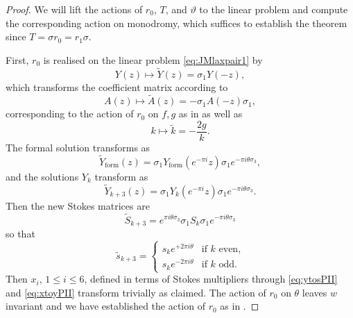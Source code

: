 \documentclass[a4paper,reqno]{amsart}
\numberwithin{equation}{section}
\numberwithin{equation}{section}
\begin{document}
\begin{proof}
    We will lift the actions of $r_0$, $T$, and $\vartheta$ to the linear problem and compute the corresponding action on monodromy, which suffices to establish the theorem since $T=\sigma r_0 = r_1\sigma$.
    
    First, $r_0$ is realised on the linear problem \eqref{eq:JMlaxpair1} by 
    $$Y(z)\mapsto \widetilde{Y}(z)=\sigma_1 Y(-z),$$
    which transforms the coefficient matrix according to 
    $$A(z)\mapsto \widetilde{A}(z) = - \sigma_1 A(-z)\sigma_1,$$
    corresponding to the action of $r_0$ on $f,g$ as in  as well as 
    $$ k \mapsto \tilde{k}= -\frac{2 g}{k}.$$
    The formal solution transforms as 
    $$ \widetilde{Y}_{\operatorname{form}}(z) = \sigma_1 Y_{\operatorname{form}}(e^{-\pi i}z)\sigma_1 e^{-\pi i \theta \sigma_3},$$
    and the solutions $Y_k$ transform as
 $$\widetilde{Y}_{k+3}(z) = \sigma_1 Y_k(e^{-\pi i }z)\sigma_1 e^{-\pi i \theta \sigma_3}.$$
Then the new Stokes matrices are
$$\widetilde{S}_{k+3}=e^{\pi i \theta \sigma_3}\sigma_1 S_k\sigma_1 e^{-\pi i \theta \sigma_3}$$
so that
$$\tilde{s}_{k+3}=\begin{cases}
    s_k e^{+2\pi i\theta} &\text{if $k$ even,}\\
    s_k e^{-2\pi i\theta} &\text{if $k$ odd.}
\end{cases}$$
    Then $x_i$, $1\leq i\leq 6$, defined in terms of Stokes multipliers through \eqref{eq:ytosPII} and \eqref{eq:xtoyPII} transform trivially as claimed.    
    The action of $r_0$ on $\theta$ leaves $w$ invariant and we have established the action of $r_0$ as in .


\end{proof}
\end{document}
